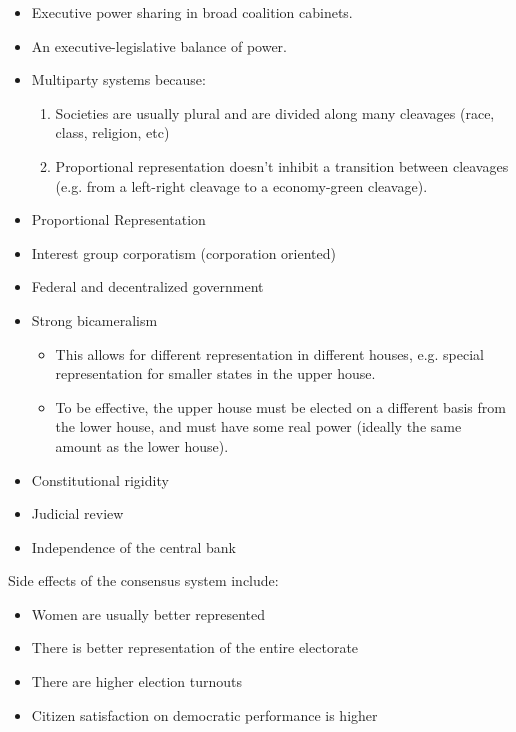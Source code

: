 \begin{itemize}
  \item Executive power sharing in broad coalition cabinets.
  \item An executive-legislative balance of power.
  \item Multiparty systems because:
    \begin{enumerate}
      \item Societies are usually plural and are divided along many
        cleavages (race, class, religion, etc)
      \item Proportional representation doesn't inhibit a transition
        between cleavages (e.g. from a left-right cleavage to a
        economy-green cleavage).
    \end{enumerate}
    \item Proportional Representation
    \item Interest group corporatism (corporation oriented)
    \item Federal and decentralized government
    \item Strong bicameralism
      \begin{itemize}
        \item This allows for different representation in different
          houses, e.g. special representation for smaller states in the
          upper house.
        \item To be effective, the upper house must be elected on a
          different basis from the lower house, and must have some
          real power (ideally the same amount as the lower house).
      \end{itemize}
    \item Constitutional rigidity
    \item Judicial review
    \item Independence of the central bank
\end{itemize}

Side effects of the consensus system include:

\begin{itemize}
  \item Women are usually better represented
  \item There is better representation of the entire electorate
  \item There are higher election turnouts
  \item Citizen satisfaction on democratic performance is higher
\end{itemize}

